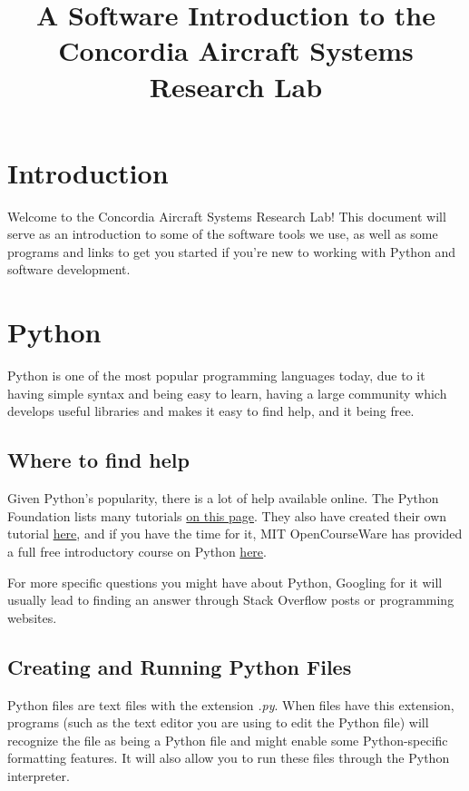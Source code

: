 \documentclass[letterpaper, 12pt]{article}
\title{A Software Introduction to the Concordia Aircraft Systems Research Lab}
\author{}
\date{}
\begin{document}
\maketitle
\tableofcontents
\section{Introduction}
Welcome to the Concordia Aircraft Systems Research Lab! This document will serve as an introduction to some of the software tools we use, as well as some programs and links to get you started if you're new to working with Python and software development.

\section{Python}
Python is one of the most popular programming languages today, due to it having simple syntax and being easy to learn, having a large community which develops useful libraries and makes it easy to find help, and it being free. 

\subsection{Where to find help}
Given Python's popularity, there is a lot of help available online. The Python Foundation lists many tutorials \href{https://wiki.python.org/moin/BeginnersGuide/Programmers}{on this page}. They also have created their own tutorial \href{https://docs.python.org/3/tutorial/}{here}, and if you have the time for it, MIT OpenCourseWare has provided a full free introductory course on Python \href{https://ocw.mit.edu/courses/electrical-engineering-and-computer-science/6-0001-introduction-to-computer-science-and-programming-in-python-fall-2016/lecture-videos/}{here}.

For more specific questions you might have about Python, Googling for it will usually lead to finding an answer through Stack Overflow posts or programming websites.

\subsection{Creating and Running Python Files}
Python files are text files with the extension \emph{.py}. When files have this extension, programs (such as the text editor you are using to edit the Python file) will recognize the file as being a Python file and might enable some Python-specific formatting features. It will also allow you to run these files through the Python interpreter. 
\end{document}
